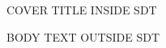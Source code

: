 \documentclass[11pt,a4paper]{article}
\begin{document}
\begin{figure}[h]
\end{figure}

COVER TITLE INSIDE SDT

BODY TEXT OUTSIDE SDT
\end{document}
